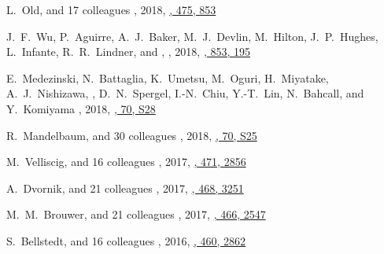 \begin{etaremune}
\item
L.~Old, and 17 colleagues
,
2018, \href{https://ui.adsabs.harvard.edu/abs/2018MNRAS.475..853O}{\mnras, 475, 853}

\item
J.~F.~Wu, P.~Aguirre, A.~J.~Baker, M.~J.~Devlin, M.~Hilton, J.~P.~Hughes, L.~Infante, R.~R.~Lindner, and \myself,
,
2018, \href{https://ui.adsabs.harvard.edu/abs/2018ApJ...853..195W}{\apj, 853, 195}

\item
E.~Medezinski, N.~Battaglia, K.~Umetsu, M.~Oguri, H.~Miyatake, A.~J.~Nishizawa, \myself, D.~N.~Spergel, I.-N.~Chiu, Y.-T.~Lin, N.~Bahcall, and Y.~Komiyama
,
2018, \href{https://ui.adsabs.harvard.edu/abs/2018PASJ...70S..28M}{\pasj, 70, S28}

\item
R.~Mandelbaum, and 30 colleagues
,
2018, \href{https://ui.adsabs.harvard.edu/abs/2018PASJ...70S..25M}{\pasj, 70, S25}

\item
M.~Velliscig, and 16 colleagues
,
2017, \href{https://ui.adsabs.harvard.edu/abs/2017MNRAS.471.2856V}{\mnras, 471, 2856}

\item
A.~Dvornik, and 21 colleagues
,
2017, \href{https://ui.adsabs.harvard.edu/abs/2017MNRAS.468.3251D}{\mnras, 468, 3251}

\item
M.~M.~Brouwer, and 21 colleagues
,
2017, \href{https://ui.adsabs.harvard.edu/abs/2017MNRAS.466.2547B}{\mnras, 466, 2547}

\item
S.~Bellstedt, and 16 colleagues
,
2016, \href{https://ui.adsabs.harvard.edu/abs/2016MNRAS.460.2862B}{\mnras, 460, 2862}


\end{etaremune}
